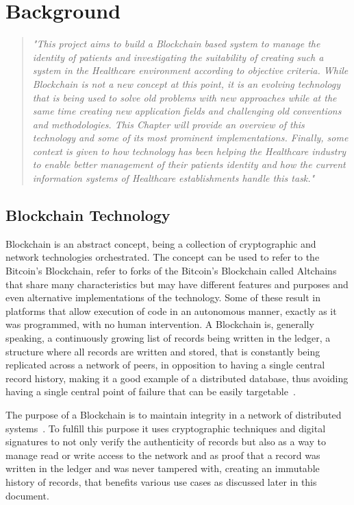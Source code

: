 \chapter{Background}\label{background}


\begin{quote} \emph{"This project aims to build a Blockchain based system to
  manage the identity of patients and investigating the suitability of creating
  such a system in the Healthcare environment according to objective criteria.
  While Blockchain is not a new concept at this point, it is an evolving
  technology that is being used to solve old problems with new approaches while
  at the same time creating new application fields and challenging old
  conventions and methodologies. This Chapter will provide an overview of this
  technology and some of its most prominent implementations. Finally, some
  context is given to how technology has been helping the Healthcare industry
  to enable better management of their patients identity and how the current
  information systems of Healthcare establishments handle this task."}
\end{quote}

\section{Blockchain Technology}

Blockchain is an abstract concept, being a collection of cryptographic and
network technologies orchestrated. The concept can be used to refer to the
Bitcoin's Blockchain, refer to forks of the Bitcoin's Blockchain called
Altchains~\cite{Lewis2015} that share many characteristics but may have
different features and purposes and even alternative implementations of the
technology. Some of these result in platforms that allow execution of code in
an autonomous manner, exactly as it was programmed, with no human intervention.
A Blockchain is, generally speaking, a continuously growing list of records
being written in the ledger, a structure where all records are written and
stored, that is constantly being replicated across a network of peers, in
opposition to having a single central record history, making it a good example
of a distributed database, thus avoiding having a single central point of
failure that can be easily targetable~\cite{Barclay2017}.

The purpose of a Blockchain is to maintain integrity in a network of
distributed systems~\cite{Drescher2017}. To fulfill this purpose it uses
cryptographic techniques and digital signatures to not only verify the
authenticity of records but also as a way to manage read or write access to the
network and as proof that a record was written in the ledger and was never
tampered with, creating an immutable history of records, that benefits various
use cases as discussed later in this document.

